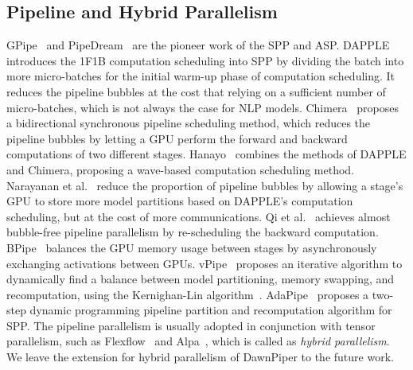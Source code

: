 \subsection{Pipeline and Hybrid Parallelism}
GPipe~\cite{huangGpipeEfficientTraining2019} and PipeDream~\cite{narayananPipeDreamGeneralizedPipeline2019} are the pioneer work of
the SPP and ASP.
DAPPLE~\cite{fanDAPPLEPipelinedData2021} introduces the 1F1B computation scheduling into SPP by dividing the batch into
more micro-batches for the initial warm-up phase of computation scheduling.
It reduces the pipeline bubbles at the cost that relying on a sufficient number of micro-batches,
which is not always the case for NLP models.
Chimera~\cite{liChimeraEfficientlyTraining2021} proposes a bidirectional synchronous pipeline scheduling method,
which reduces the pipeline bubbles by letting a GPU perform the
forward and backward computations of two different stages.
Hanayo~\cite{liuHanayoHarnessingWavelike2023} combines the methods of DAPPLE and Chimera,
proposing a wave-based computation scheduling method.
Narayanan et al.~\cite{narayananEfficientLargeScaleLanguage2021} reduce the proportion of pipeline bubbles
by allowing a stage's GPU to store more model partitions
based on DAPPLE's computation scheduling, but at the cost of more communications.
Qi et al.~\cite{qiZeroBubbleAlmost} achieves almost bubble-free pipeline parallelism by
re-scheduling the backward computation.
BPipe~\cite{kimBPipeMemoryBalancedPipeline2023} balances the GPU memory usage between stages
by asynchronously exchanging activations between GPUs.
vPipe~\cite{zhaoVPipeVirtualizedAcceleration2022} proposes an iterative algorithm to dynamically find a balance between
model partitioning, memory swapping, and recomputation,
using the Kernighan-Lin algorithm~\cite{kernighanEfficientHeuristicProcedure1970}.
AdaPipe~\cite{sunAdaPipeOptimizingPipeline2024} proposes a two-step dynamic programming pipeline partition
and recomputation algorithm for SPP.
The pipeline parallelism is usually adopted in conjunction with tensor parallelism,
such as Flexflow~\cite{jiaDataModelParallelism2019} and Alpa~\cite{zhengAlpaAutomatingInter2022}, which is called as \emph{hybrid parallelism}.
We leave the extension for hybrid parallelism of DawnPiper to the future work.

